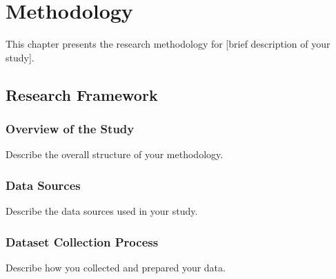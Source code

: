 \chapter{Methodology}


This chapter presents the research methodology for [brief description of your study].

\section{Research Framework}


\subsection{Overview of the Study}

Describe the overall structure of your methodology.

\subsection{Data Sources} \label{subsec:data_source}

Describe the data sources used in your study.

\subsection{Dataset Collection Process}

Describe how you collected and prepared your data.


